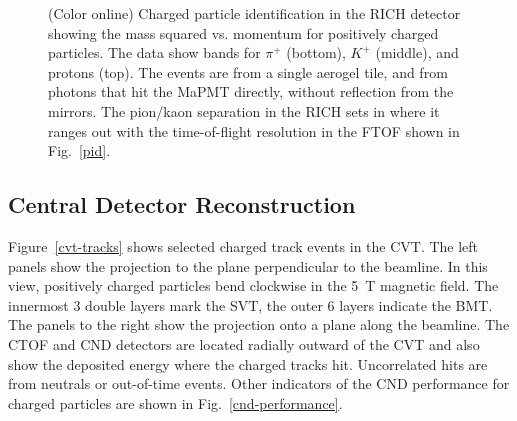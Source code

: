 \documentclass[final,3p,twocolumn]{elsarticle}
\begin{document}
\begin{figure}[t!]
\caption{(Color online) Charged particle identification in the RICH detector showing the mass squared vs. momentum for positively
  charged particles. The data show bands for $\pi^+$ (bottom), $K^+$ (middle), and protons (top). The events are
  from a single aerogel tile, and from photons that hit the MaPMT directly, without reflection from the mirrors. The
  pion/kaon separation in the RICH sets in where it ranges out with the time-of-flight resolution in the FTOF shown
  in Fig.~\ref{pid}.}
\label{rich_rec}
\end{figure}

\subsection{Central Detector Reconstruction}

Figure~\ref{cvt-tracks} shows selected charged track events in the CVT. The left panels show the projection to
the plane perpendicular to the beamline. In this view, positively charged particles bend clockwise in the 5~T
magnetic field. The innermost 3 double layers mark the SVT, the outer 6 layers indicate the BMT. The panels to
the right show the projection onto a plane along the beamline. The CTOF and CND detectors are located radially
outward of the CVT and also show the deposited energy where the charged tracks hit. Uncorrelated hits are from
neutrals or out-of-time events. Other indicators of the CND performance for charged particles are shown in
Fig.~\ref{cnd-performance}.  
\end{document}
